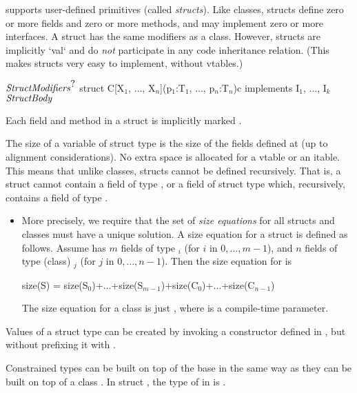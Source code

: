 \Xten{} supports user-defined primitives (called
\emph{structs}). Like classes, structs define zero or more fields and
zero or more methods, and may implement zero or more interfaces. A
struct has the same modifiers as a class. However, structs are
implicitly \xcd`val` and do \emph{not} participate in any code
inheritance relation. (This makes structs very easy to implement,
without vtables.)

\begin{xtenmath}
$\mbox{\emph{StructModifiers}}^{\mbox{?}}$
struct C[X$_1$, $\ldots$, X$_n$](p$_1$:T$_1$, $\ldots$, p$_n$:T$_n$){c} 
   implements I$_1$, $\ldots$, I$_k$ {
$\mbox{\emph{StructBody}}$
}
\end{xtenmath}

Each field and method in a struct is implicitly marked .  

The size of a variable of struct type  is the size of the fields
defined at  (up to alignment considerations). No extra space is
allocated for a vtable or an itable. This means that unlike classes,
structs cannot be defined recursively. That is, a struct  cannot
contain a field of type , or a field of struct type  which,
recursively, contains a field of type .

\begin{itemize}
\item More precisely, we require that the set of \emph{size equations}
  for all structs and classes must have a unique solution. A size
  equation for a struct  is defined as follows. Assume  has $m$ fields
  of type $_i$ (for $i$ in $0,\ldots,m-1$), and $n$ fields of type (class) $_j$
  (for $j$ in $0,\ldots,n-1$). Then the size equation for  is 
\begin{xtenmath}
size(S) = size(S$_0$)+$\ldots$+size(S$_{m-1}$)+size(C$_0$)+$\ldots$+size(C$_{n-1}$) 
\end{xtenmath}
The size
equation for a class  is just , where
 is a compile-time parameter.
\end{itemize}

Values of a struct  type can be created by invoking a constructor
defined in , but without prefixing it with .

Constrained types can be built on top of the base  in the same way as
they can be built on top of a class . In struct ,
the type of  in  is .

